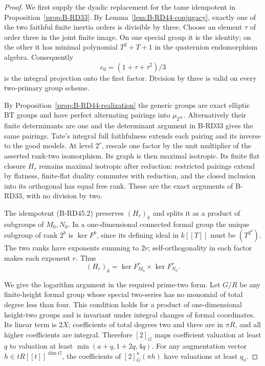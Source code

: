 \begin{proof}
We first supply the dyadic replacement for the tame idempotent
in Proposition~\ref{prop:B-RD33}.
By Lemma~\ref{lem:B-RD44-conjugacy}, exactly one of the two
faithful finite inertia orders is divisible by three.
Choose an element $\tau$ of order three in the joint finite image.
On one special group it is the identity; on the other it has
minimal polynomial $T^2+T+1$ in the quaternion endomorphism algebra.
Consequently
\[
                       e_0=(1+\tau+\tau^2)/3
 \tag{B-RD45.2}
\]
is the integral projection onto the first factor. Division by
three is valid on every two-primary group scheme.

By Proposition~\ref{prop:B-RD44-realization} the generic groups
are exact elliptic BT groups and have perfect alternating
pairings into $\mu_{2^\infty}$. Alternatively their finite
determinants are one and the determinant argument in B-RD33
gives the same pairings. Tate's integral full faithfulness
extends each pairing and its inverse to the good models.
At level $2^r$, rescale one factor by the unit multiplier of
the asserted rank-two isomorphism. Its graph is then maximal
isotropic. Its finite flat closure $H_r$ remains maximal
isotropic after reduction: restricted pairings extend by
flatness, finite-flat duality commutes with reduction, and
the closed inclusion into its orthogonal has equal free rank.
These are the exact arguments of B-RD33, with no division by two.

The idempotent (B-RD45.2) preserves $(H_r)_k$ and splits it
as a product of subgroups of $M_0,N_0$.
In a one-dimensional connected formal group the unique subgroup
of rank $2^b$ is $\ker F^b$, since its defining ideal in
$k[[T]]$ must be $(T^{2^b})$.
The two ranks have exponents summing to $2r$; self-orthogonality
in each factor makes each exponent $r$.
Thus
\[
                 (H_r)_k=\ker F_{M_0}^r\times\ker F_{N_0}^r.
 \tag{B-RD45.3}
\]

We give the logarithm argument in the required prime-two form.
Let $G/R$ be any finite-height formal group whose special
two-series has no monomial of total degree less than four.
This condition holds for a product of one-dimensional
height-two groups and is invariant under integral changes
of formal coordinates. Its linear term is $2X$; coefficients
of total degrees two and three are in $\pi R$, and all higher
coefficients are integral. Therefore $[2]_G$ maps coefficient
valuation at least $q$ to valuation at least
$\min(a+q,1+2q,4q)$.
For any augmentation vector $h\in tR[[t]]^{\dim G}$,
the coefficients of $[2]^u_G(\pi h)$ have valuations at
least $q_u$.


\end{proof}
